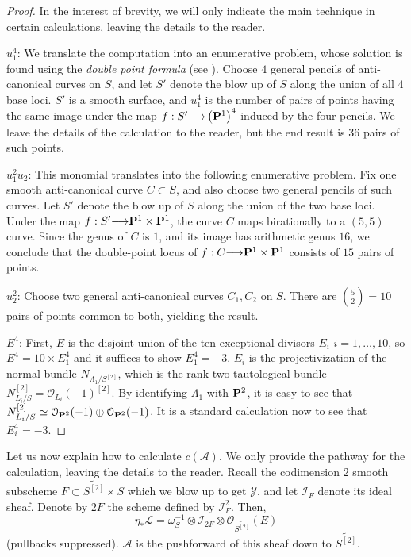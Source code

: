 \documentclass[12pt,reqno]{amsart}
\renewcommand{\to}{{\longrightarrow}}
\numberwithin{equation}{section}
\renewcommand{\O}{\mathcal O}
\newcommand{\td}{\widetilde}
\begin{document}
\begin{proof} In the interest of brevity, we will only indicate the
  main technique in certain calculations, leaving the details to the reader.

  $u_{1}^{4}$: We translate the computation into an enumerative
  problem, whose solution is found using the {\sl double point
    formula} (see \cite[~Theorem 2]{ful:78}).  Choose $4$ general pencils
  of anti-canonical curves on $S$, and let $S'$ denote the blow up of
  $S$ along the union of all $4$ base loci.  $S'$ is a smooth surface,
  and $u_{1}^{4}$ is the number of pairs of points having the same
  image under the map $f: S' \to \left( \P^{1} \right)^{4}$ induced by
  the four pencils.  We leave the details of the calculation to the
  reader, but the end result is $36$ pairs of such points.

  $u_{1}^{2}u_{2}$: This monomial translates into the following
  enumerative problem.  Fix one smooth anti-canonical curve
  $C \subset S$, and also choose two general pencils of such curves.
  Let $S'$ denote the blow up of $S$ along the union of the two base
  loci.  Under the map $f: S' \to \P^{1} \times \P^{1}$, the curve $C$
  maps birationally to a $(5,5)$ curve. Since the genus of $C$ is $1$,
  and its image has arithmetic genus $16$, we conclude that the
  double-point locus of $f: C \to \P^{1} \times \P^{1}$ consists of
  $15$ pairs of points.

  $u_{2}^{2}$: Choose two general anti-canonical curves $C_{1},C_{2}$
  on $S$.  There are ${5 \choose 2} = 10$ pairs of points common to
  both, yielding the result.

  $E^{4}$: First, $E$ is the disjoint union of the ten exceptional
  divisors $E_{i}$ $i=1, \dots, 10$, so $E^{4} = 10 \times E_{1}^{4}$
  and it suffices to show $E_{1}^{4} = -3$.  $E_{i}$ is the
  projectivization of the normal bundle $N_{\Lambda_{1}/S^{[2]}}$,
  which is the rank two tautological bundle
  $N_{L_{i}/S}^{[2]} = \O_{L_{i}}(-1)^{[2]}$.  By identifying
  $\Lambda_{1}$ with $\P^{2}$, it is easy to see that
  $N_{L_{i}/S}^{[2]} \simeq \O_{\P^{2}}(-1) \oplus
  \O_{\P^{2}}(-1)$. It is a standard calculation now to see that
  $E_{i}^{4} = -3$.
\end{proof}

Let us now explain how to calculate $c(\mathcal{A})$.  We only provide
the pathway for the calculation, leaving the details to the
reader. Recall the codimension $2$ smooth subscheme
$F \subset \td{S^{[2]}} \times S$ which we blow up to get
$\mathcal{Y}$, and let $\mathcal{I}_{F}$ denote its ideal sheaf.
Denote by $2F$ the scheme defined by $\mathcal{I}_{F}^{2}$.  Then, \
\[\eta_{*}\mathcal{L} = \omega_{S}^{-1} \otimes \mathcal{I}_{2F} \otimes \O_{\td{S^{[2]}}}(E)\]
(pullbacks suppressed).  $\mathcal{A}$ is the pushforward of this
sheaf down to $\td{S^{[2]}}$.
\end{document}
